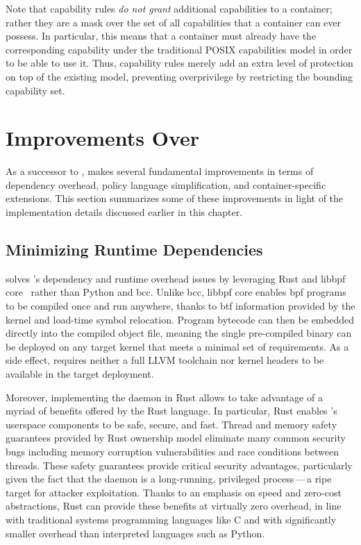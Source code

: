 Note that capability rules \textit{do not grant} additional capabilities to a container;
rather they are a mask over the set of all capabilities that a container can ever possess.
In particular, this means that a container must already have the corresponding capability
under the traditional POSIX capabilities model in order to be able to use it. Thus,
capability rules merely add an extra level of protection on top of the existing model,
preventing overprivilege by restricting the bounding capability set.


\section{Improvements Over \bpfbox{}}%
\label{s:bpfcontain-improvements}

As a successor to \bpfbox{}, \bpfcontain{} makes several fundamental improvements in terms
of dependency overhead, policy language simplification, and container-specific extensions.
This section summarizes some of these improvements in light of the implementation details
discussed earlier in this chapter.

\subsection{Minimizing Runtime Dependencies}%
\label{ss:bpfcontain-minimizing}

\bpfcontain{} solves \bpfbox{}'s dependency and runtime overhead issues by leveraging Rust
and libbpf \gls{core}~\cite{nakryiko2020_core} rather than Python and bcc.  Unlike bcc,
libbpf \gls{core} enables \gls{bpf} programs to be compiled once and run anywhere, thanks
to \gls{btf} information provided by the kernel and load-time symbol relocation. Program
bytecode can then be embedded directly into the compiled object file, meaning the single
pre-compiled \bpfcontain{} binary can be deployed on any target kernel that meets
a minimal set of requirements. As a side effect, \bpfcontain{} requires neither a full
LLVM toolchain nor kernel headers to be available in the target deployment.

Moreover, implementing the \bpfcontain{} daemon in Rust allows \bpfcontain{} to take
advantage of a myriad of benefits offered by the Rust language. In particular, Rust
enables \bpfcontain{}'s userspace components to be safe, secure, and fast. Thread and
memory safety guarantees provided by Rust ownership model eliminate many common security
bugs including memory corruption vulnerabilities and race conditions between threads.
These safety guarantees provide critical security advantages, particularly given the fact
that the \bpfcontain{} daemon is a long-running, privileged process\,---\,a ripe target
for attacker exploitation. Thanks to an emphasis on speed and zero-cost abstractions, Rust
can provide these benefits at virtually zero overhead, in line with traditional systems
programming languages like C and with significantly smaller overhead than interpreted
languages such as Python.

